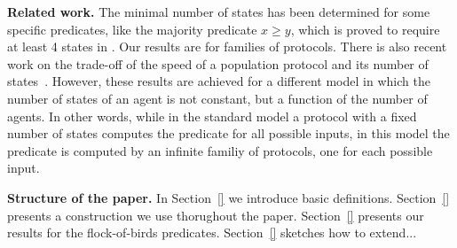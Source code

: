 \medskip\noindent \textbf{Related work.} The minimal number of states
has been determined for some specific predicates, like the majority
predicate $x \geq y$, which is proved to require at least 4 states in
\cite{}.  Our results are for families of protocols. There is also
recent work on the trade-off of the speed of a population protocol and
its number of states~\cite{AAEGR17}. However, these results are
achieved for a different model in which the number of states of an
agent is not constant, but a function of the number of agents. In
other words, while in the standard model a protocol with a fixed
number of states computes the predicate for all possible inputs, in
this model the predicate is computed by an infinite familiy of
protocols, one for each possible input.


\medskip\noindent \textbf{Structure of the paper.} In Section~\ref{}
we introduce basic definitions. Section~\ref{} presents a construction
we use thorughout the paper. Section~\ref{} presents our results for
the flock-of-birds predicates. Section~\ref{} sketches how to extend...

